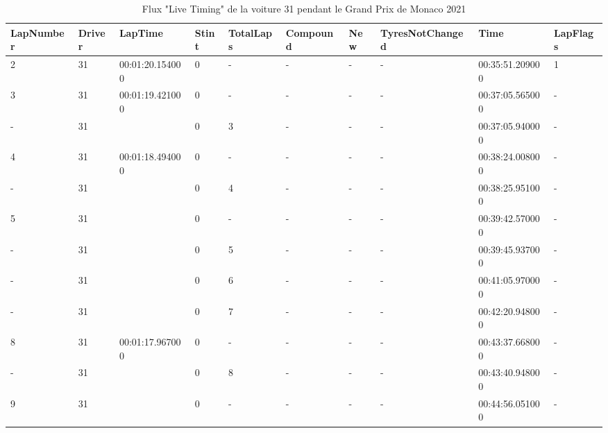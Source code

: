 \documentclass[
    iict, %
    il, %
]{heig-tb}
\begin{document}
\begin{landscape}
    \begin{table}[H]
        \begin{center}
            \caption{Flux "\label{Live Timing}Live Timing" de la voiture 31 pendant le Grand Prix de Monaco 2021}
            \begin{tabular}{llllllllll}
                LapNumber & Driver & LapTime         & Stint & TotalLaps & Compound & New & TyresNotChanged & Time            & LapFlags \\ \hline
                2         & 31     & 00:01:20.154000 & 0     & -         & -        & -   & -               & 00:35:51.209000 & 1        \\
                3         & 31     & 00:01:19.421000 & 0     & -         & -        & -   & -               & 00:37:05.565000 & -        \\
                -         & 31     &                 & 0     & 3         & -        & -   & -               & 00:37:05.940000 & -        \\
                4         & 31     & 00:01:18.494000 & 0     & -         & -        & -   & -               & 00:38:24.008000 & -        \\
                -         & 31     &                 & 0     & 4         & -        & -   & -               & 00:38:25.951000 & -        \\
                5         & 31     &                 & 0     & -         & -        & -   & -               & 00:39:42.570000 & -        \\
                -         & 31     &                 & 0     & 5         & -        & -   & -               & 00:39:45.937000 & -        \\
                -         & 31     &                 & 0     & 6         & -        & -   & -               & 00:41:05.970000 & -        \\
                -         & 31     &                 & 0     & 7         & -        & -   & -               & 00:42:20.948000 & -        \\
                8         & 31     & 00:01:17.967000 & 0     & -         & -        & -   & -               & 00:43:37.668000 & -        \\
                -         & 31     &                 & 0     & 8         & -        & -   & -               & 00:43:40.948000 & -        \\
                9         & 31     &                 & 0     & -         & -        & -   & -               & 00:44:56.051000 & -        \\

\end{tabular}
\end{center}
\end{table}
\end{landscape}
\end{document}
